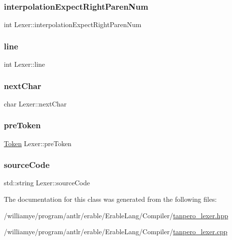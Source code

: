 \mbox{\label{class_lexer_aa9c1cbb2a3e7e13cdd9a2004db26b2b1}} 
\subsubsection{\texorpdfstring{interpolationExpectRightParenNum}{interpolationExpectRightParenNum}}
{\footnotesize\ttfamily int Lexer\+::interpolation\+Expect\+Right\+Paren\+Num}

\mbox{\label{class_lexer_a35d0802ee5cced4c5294fb6dc77ad2f4}} 
\subsubsection{\texorpdfstring{line}{line}}
{\footnotesize\ttfamily int Lexer\+::line}

\mbox{\label{class_lexer_aae947741e1e4766d1a8028712fe2f266}} 
\subsubsection{\texorpdfstring{nextChar}{nextChar}}
{\footnotesize\ttfamily char Lexer\+::next\+Char}

\mbox{\label{class_lexer_aaa6452328e54f01df81b4c46c2dafdfc}} 
\subsubsection{\texorpdfstring{preToken}{preToken}}
{\footnotesize\ttfamily \mbox{\hyperlink{struct_token}{Token}} Lexer\+::pre\+Token}

\mbox{\label{class_lexer_a028378af5c43831b7a6dc459ea46c840}} 
\subsubsection{\texorpdfstring{sourceCode}{sourceCode}}
{\footnotesize\ttfamily std\+::string Lexer\+::source\+Code}



The documentation for this class was generated from the following files\+:\begin{DoxyCompactItemize}
\item 
/williamye/program/antlr/erable/\+Erable\+Lang/\+Compiler/\mbox{\hyperlink{tanpero__lexer_8hpp}{tanpero\+\_\+lexer.\+hpp}}\item 
/williamye/program/antlr/erable/\+Erable\+Lang/\+Compiler/\mbox{\hyperlink{tanpero__lexer_8cpp}{tanpero\+\_\+lexer.\+cpp}}\end{DoxyCompactItemize}
